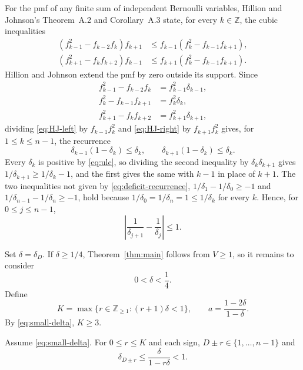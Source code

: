 \documentclass[ECP]{ejpecp}
\begin{document}
For the pmf of any finite sum of independent Bernoulli variables, Hillion and
Johnson's Theorem~A.2 and Corollary~A.3 state, for every $k\in\mathbb Z$,
the cubic inequalities \cite[equations~(78)--(79)]{hillionjohnson2016}
\begin{align}
  (f_{k-1}^2-f_{k-2}f_k)f_{k+1}
  &\leq f_{k-1}(f_k^2-f_{k-1}f_{k+1}),
  \label{eq:HJ-left}\\
  (f_{k+1}^2-f_kf_{k+2})f_{k-1}
  &\leq f_{k+1}(f_k^2-f_{k-1}f_{k+1}).
  \label{eq:HJ-right}
\end{align}
Hillion and Johnson extend the pmf by zero outside its support. Since
\[
\begin{aligned}
  f_{k-1}^2-f_{k-2}f_k&=f_{k-1}^2\delta_{k-1},\\
  f_k^2-f_{k-1}f_{k+1}&=f_k^2\delta_k,\\
  f_{k+1}^2-f_kf_{k+2}&=f_{k+1}^2\delta_{k+1},
\end{aligned}
\]
dividing \eqref{eq:HJ-left} by $f_{k-1}f_k^2$ and \eqref{eq:HJ-right} by
$f_{k+1}f_k^2$ gives, for $1\leq k\leq n-1$, the recurrence
\begin{equation}\label{eq:deficit-recurrence}
  \delta_{k-1}(1-\delta_k)\leq\delta_k,
  \qquad
  \delta_{k+1}(1-\delta_k)\leq\delta_k.
\end{equation}
Every $\delta_k$ is positive by \eqref{eq:ulc}, so dividing the second
inequality by $\delta_k\delta_{k+1}$ gives $1/\delta_{k+1}\geq1/\delta_k-1$,
and the first gives the same with $k-1$ in place of $k+1$. The two
inequalities not given by \eqref{eq:deficit-recurrence},
$1/\delta_1-1/\delta_0\geq-1$ and $1/\delta_{n-1}-1/\delta_n\geq-1$, hold
because $1/\delta_0=1/\delta_n=1\leq1/\delta_k$ for every $k$. Hence, for
$0\leq j\leq n-1$,
\begin{equation}\label{eq:reciprocal}
  \left|\frac1{\delta_{j+1}}-\frac1{\delta_j}\right|\leq1.
\end{equation}

Set $\delta=\delta_D$. If $\delta\geq1/4$,
Theorem~\ref{thm:main} follows from $V\geq1$, so it remains to consider
\begin{equation}\label{eq:small-delta}
  0<\delta<\frac14.
\end{equation}
Define
\begin{equation}\label{eq:K-a}
  K=\max\{r\in\mathbb Z_{\geq1}:(r+1)\delta<1\},
  \qquad
  a=\frac{1-2\delta}{1-\delta}.
\end{equation}
By \eqref{eq:small-delta}, $K\geq3$.

\begin{lemma}\label{lem:propagation}
  Assume \eqref{eq:small-delta}. For $0\leq r\leq K$ and each sign,
  $D\pm r\in\{1,\ldots,n-1\}$ and
  \begin{equation}\label{eq:deficit-bound}
    \delta_{D\pm r}\leq\frac{\delta}{1-r\delta}<1.
  \end{equation}
\end{lemma}
\end{document}
